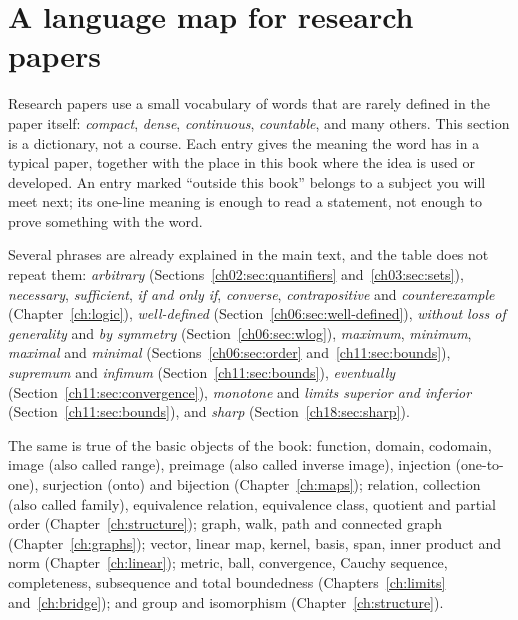 \section{A language map for research papers}\label{appC:sec:language}
Research papers use a small vocabulary of words that are rarely defined in the paper itself: \emph{compact}, \emph{dense}, \emph{continuous}, \emph{countable}, and many others. This section is a dictionary, not a course. Each entry gives the meaning the word has in a typical paper, together with the place in this book where the idea is used or developed. An entry marked ``outside this book'' belongs to a subject you will meet next; its one-line meaning is enough to read a statement, not enough to prove something with the word.

Several phrases are already explained in the main text, and the table does not repeat them: \emph{arbitrary} (Sections~\ref{ch02:sec:quantifiers} and~\ref{ch03:sec:sets}), \emph{necessary}, \emph{sufficient}, \emph{if and only if}, \emph{converse}, \emph{contrapositive} and \emph{counterexample} (Chapter~\ref{ch:logic}), \emph{well-defined} (Section~\ref{ch06:sec:well-defined}), \emph{without loss of generality} and \emph{by symmetry} (Section~\ref{ch06:sec:wlog}), \emph{maximum}, \emph{minimum}, \emph{maximal} and \emph{minimal} (Sections~\ref{ch06:sec:order} and~\ref{ch11:sec:bounds}), \emph{supremum} and \emph{infimum} (Section~\ref{ch11:sec:bounds}), \emph{eventually} (Section~\ref{ch11:sec:convergence}), \emph{monotone} and \emph{limits superior and inferior} (Section~\ref{ch11:sec:bounds}), and \emph{sharp} (Section~\ref{ch18:sec:sharp}).

The same is true of the basic objects of the book: function, domain, codomain, image (also called range), preimage (also called inverse image), injection (one-to-one), surjection (onto) and bijection (Chapter~\ref{ch:maps}); relation, collection (also called family), equivalence relation, equivalence class, quotient and partial order (Chapter~\ref{ch:structure}); graph, walk, path and connected graph (Chapter~\ref{ch:graphs}); vector, linear map, kernel, basis, span, inner product and norm (Chapter~\ref{ch:linear}); metric, ball, convergence, Cauchy sequence, completeness, subsequence and total boundedness (Chapters~\ref{ch:limits} and~\ref{ch:bridge}); and group and isomorphism (Chapter~\ref{ch:structure}).

